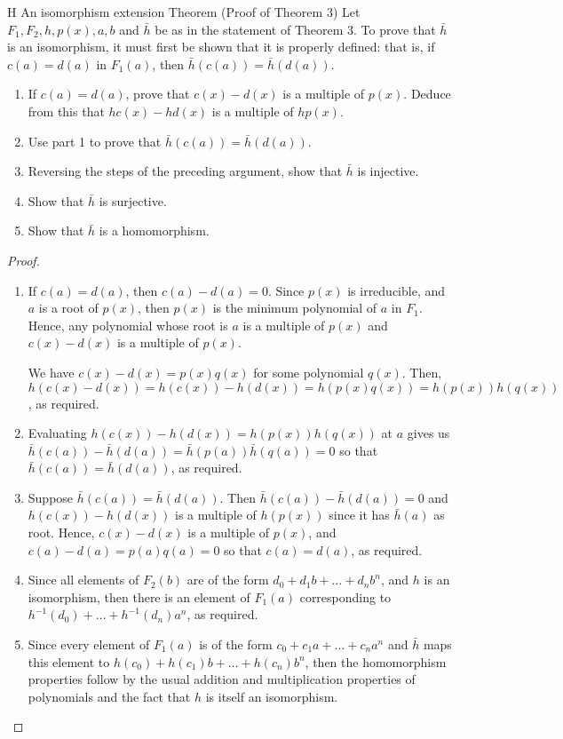 \begin{exercise}{H An isomorphism extension Theorem (Proof of Theorem 3)}
Let $F_1,F_2,h,p(x),a,b$ and $\bar{h}$ be as in the statement of Theorem 3. To prove that $\bar{h}$ is an isomorphism, it must first be shown that it is properly defined: that is, if $c(a)=d(a)$ in $F_1(a)$, then $\bar{h}(c(a))=\bar{h}(d(a))$.
\begin{enumerate}
    \item If $c(a)=d(a)$, prove that $c(x)-d(x)$ is a multiple of $p(x)$. Deduce from this that $hc(x)-hd(x)$ is a multiple of $hp(x)$.
    \item Use part 1 to prove that $\bar{h}(c(a))=\bar{h}(d(a))$.
    \item Reversing the steps of the preceding argument, show that $\bar{h}$ is injective.
    \item Show that $\bar{h}$ is surjective.
    \item Show that $\bar{h}$ is a homomorphism.
\end{enumerate}
\end{exercise}
\begin{proof}
 \begin{enumerate}
     \item If $c(a)=d(a)$, then $c(a)-d(a)=0$. Since $p(x)$ is irreducible, and $a$ is a root of $p(x)$, then $p(x)$ is the minimum polynomial of $a$ in $F_1$. Hence, any polynomial whose root is $a$ is a multiple of $p(x)$ and $c(x)-d(x)$ is a multiple of $p(x)$.

     We have $c(x)-d(x)=p(x)q(x)$ for some polynomial $q(x)$. Then, $h(c(x)-d(x))=h(c(x))-h(d(x))=h(p(x)q(x))=h(p(x))h(q(x))$, as required.
     \item Evaluating $h(c(x))-h(d(x))=h(p(x))h(q(x))$ at $a$ gives us $\bar{h}(c(a))-\bar{h}(d(a))=\bar{h}(p(a))\bar{h}(q(a))=0$ so that $\bar{h}(c(a))=\bar{h}(d(a))$, as required.
     \item Suppose $\bar{h}(c(a))=\bar{h}(d(a))$. Then $\bar{h}(c(a))-\bar{h}(d(a))=0$ and $h(c(x))-h(d(x))$ is a multiple of $h(p(x))$ since it has $\bar{h}(a)$ as root. Hence, $c(x)-d(x)$ is a multiple of $p(x)$, and $c(a)-d(a)=p(a)q(a)=0$ so that $c(a)=d(a)$, as required.
     \item Since all elements of $F_2(b)$ are of the form $d_0+d_1b+\dots+d_nb^n$, and $h$ is an isomorphism, then there is an element of $F_1(a)$ corresponding to $h^{-1}(d_0)+\dots+h^{-1}(d_n)a^n$, as required.
     \item Since every element of $F_1(a)$ is of the form $c_0+c_1a+\dots+c_na^n$ and $\bar{h}$ maps this element to $h(c_0)+h(c_1)b+\dots+h(c_n)b^n$, then the homomorphism properties follow by the usual addition and multiplication properties of polynomials and the fact that $h$ is itself an isomorphism.
 \end{enumerate}
\end{proof}

